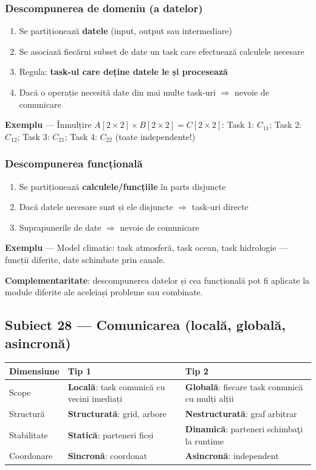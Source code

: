\documentclass[a4paper,11pt]{article}
\newcommand{\thead}[1]{\cellcolor{tblh}\color{white}\textbf{#1}}
\newcommand{\subiect}[2]{\subsection{Subiect \textcolor{numcol}{#1} — #2}}
\begin{document}
\subsubsection{Descompunerea de domeniu (a datelor)}
\begin{enumerate}[noitemsep]
  \item Se partiționează \textbf{datele} (input, output sau intermediare)
  \item Se asociază fiecărui subset de date un task care efectuează calculele necesare
  \item Regula: \textbf{task-ul care deține datele le și procesează}
  \item Dacă o operație necesită date din mai multe task-uri $\Rightarrow$ nevoie de comunicare
\end{enumerate}

\textbf{Exemplu} — Înmulțire $A[2\times2] \times B[2\times2] = C[2\times2]$:
Task 1: $C_{11}$; Task 2: $C_{12}$; Task 3: $C_{21}$; Task 4: $C_{22}$ (toate independente!)

\subsubsection{Descompunerea funcțională}
\begin{enumerate}[noitemsep]
  \item Se partiționează \textbf{calculele/funcțiile} în parts disjuncte
  \item Dacă datele necesare sunt și ele disjuncte $\Rightarrow$ task-uri directe
  \item Suprapunerile de date $\Rightarrow$ nevoie de comunicare
\end{enumerate}

\textbf{Exemplu} — Model climatic: task atmosferă, task ocean, task hidrologie — funcții diferite, date schimbate prin canale.

\begin{notebox}
\textbf{Complementaritate}: descompunerea datelor și cea funcțională pot fi aplicate la module diferite ale aceleiași probleme sau combinate.
\end{notebox}

\subiect{28}{Comunicarea (locală, globală, asincronă)}

\begin{center}
\begin{tabular}{lll}
\toprule
\thead{Dimensiune} & \thead{Tip 1} & \thead{Tip 2} \\
\midrule
Scope & \textbf{Locală}: task comunică cu vecini imediați & \textbf{Globală}: fiecare task comunică cu mulți alții \\
Structură & \textbf{Structurată}: grid, arbore & \textbf{Nestructurată}: graf arbitrar \\
Stabilitate & \textbf{Statică}: parteneri ficși & \textbf{Dinamică}: parteneri schimbaţi la runtime \\
Coordonare & \textbf{Sincronă}: coordonat & \textbf{Asincronă}: independent \\
\bottomrule
\end{tabular}
\end{center}
\end{document}
